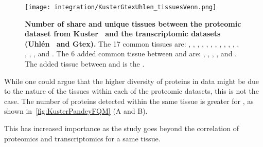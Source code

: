 \begin{figure}[!htbp]
    \texttt{[image: integration/KusterGtexUhlen\_tissuesVenn.png]}
    \centering
    \caption[Number of share and unique tissues between the proteomic dataset
    from Kuster \etal\ and the transcriptomic datasets (Uhlén \etal\ and
    Gtex)]{\label{fig:VennTissueKusterGtexUhlen}\textbf{Number of share and unique
    tissues between the proteomic dataset from Kuster \etal\ and the
    transcriptomic datasets (Uhlén \etal\ and Gtex).} The 17 common tissues are:
    , , ,  ,
    , , , ,
    , , , ,
    , , ,  and
    . The 6 added common tissue between  and
     are: , ,
    , ,  and .
    The added tissue between  and  is the
    .}
\end{figure}

While one could argue that the higher diversity of proteins in
 data might be due to the nature of the tissues within
each of the proteomic datasets, this is not the case. The number of proteins
detected within the same tissue is greater for  ,
as shown in~\cref{fig:KusterPandeyFQM} (A and B).

This has increased importance as the study goes beyond the correlation of
proteomics and transcriptomics for a same tissue.

\newcommand{\figKustPandFQM}{\textbf{Distribution of proteins across the
tissues.}\\The tissues are ordered by the number of different proteins they
expressed. Highlighted in red are the proteins that are found solely in that
tissue (within each dataset).
A\textbar\ Kuster (first quantification method).
B\textbar\ Pandey (first quantification method).
C\textbar\ Pandey (second quantification method).
There are far much more detected and quantified proteins per tissue in the
\dataset{Pandey \etal} dataset (B\textbar) than the
\dataset{Kuster \etal} dataset (A\textbar). We can notice that while
\tissue{Testis} is the tissue that presents the highest number and
diversity of expressed proteins for both datasets, the other tissues are not in
the same order.}


